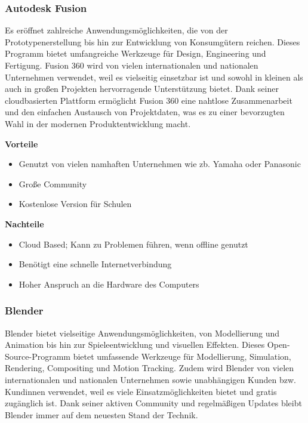 \subsubsection{Autodesk Fusion}
Es eröffnet zahlreiche Anwendungsmöglichkeiten, die von der Prototypenerstellung bis hin zur Entwicklung von Konsumgütern reichen. Dieses Programm bietet umfangreiche Werkzeuge für Design, Engineering und Fertigung.  Fusion 360 wird von vielen internationalen und nationalen Unternehmen verwendet, weil es vielseitig einsetzbar ist und sowohl in kleinen als auch in großen Projekten hervorragende Unterstützung bietet. Dank seiner cloudbasierten Plattform ermöglicht Fusion 360 eine nahtlose Zusammenarbeit und den einfachen Austausch von Projektdaten, was es zu einer bevorzugten Wahl in der modernen Produktentwicklung macht. \\
\textcite{AutodeskFusion}

\textbf{Vorteile}
\begin{itemize}
	\item Genutzt von vielen namhaften Unternehmen wie zb. Yamaha oder Panasonic
	\item Große Community
	\item Kostenlose Version für Schulen
\end{itemize} 

\textbf{Nachteile}
\begin{itemize}
	\item Cloud Based; Kann zu Problemen führen, wenn offline genutzt 
	\item Benötigt eine schnelle Internetverbindung
	\item Hoher Anspruch an die Hardware des Computers
\end{itemize}
\textcite{AutodeskFusionReviews}


\subsubsection{Blender} 
Blender bietet vielseitige Anwendungsmöglichkeiten, von Modellierung und Animation bis hin zur Spieleentwicklung und visuellen Effekten. Dieses Open-Source-Programm bietet umfassende Werkzeuge für Modellierung, Simulation, Rendering, Compositing und Motion Tracking. Zudem wird Blender von vielen internationalen und nationalen Unternehmen sowie unabhängigen Kunden bzw. Kundinnen verwendet, weil es viele Einsatzmöglichkeiten bietet und gratis zugänglich ist. Dank seiner aktiven Community und regelmäßigen Updates bleibt Blender immer auf dem neuesten Stand der Technik. \\
\textcite{Blender}

